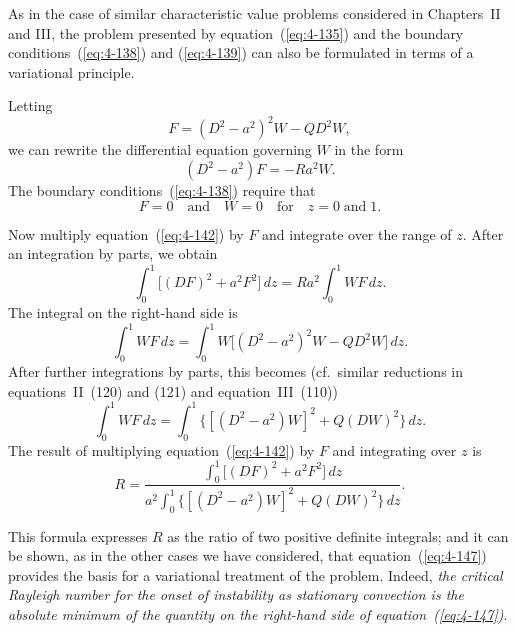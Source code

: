 As in the case of similar characteristic value problems considered in Chapters~II and III, the problem presented by equation~(\ref{eq:4-135}) and the boundary conditions~(\ref{eq:4-138}) and (\ref{eq:4-139}) can also be formulated in terms of a variational principle.

Letting
\begin{equation}
\label{eq:4-141}
F = (D^2-a^2)^2 W - QD^2 W,
\end{equation}
we can rewrite the differential equation governing $W$ in the form
\begin{equation}
\label{eq:4-142}
(D^2-a^2)F = -Ra^2 W.
\end{equation}
The boundary conditions~(\ref{eq:4-138}) require that
\begin{equation}
\label{eq:4-143}
F = 0 \quad\text{and}\quad W = 0 \quad \text{for}\quad z = 0\;\text{and}\;1.
\end{equation}

Now multiply equation~(\ref{eq:4-142}) by $F$ and integrate over the range of $z$. After an integration by parts, we obtain
\begin{equation}
\label{eq:4-144}
\int_0^1 \bigl[(DF)^2+a^2 F^2\bigr]\,dz = Ra^2\int_0^1 WF\,dz.
\end{equation}
The integral on the right-hand side is
\begin{equation}
\label{eq:4-145}
\int_0^1 WF\,dz = \int_0^1 W\bigl[(D^2-a^2)^2 W - QD^2 W\bigr]\,dz.
\end{equation}
After further integrations by parts, this becomes (cf.\ similar reductions in equations~II~(120) and (121) and equation~III~(110))
\begin{equation}
\label{eq:4-146}
\int_0^1 WF\,dz = \int_0^1\bigl\{[(D^2-a^2)W]^2+Q(DW)^2\bigr\}\,dz.
\end{equation}
The result of multiplying equation~(\ref{eq:4-142}) by $F$ and integrating over $z$ is
\begin{equation}
\label{eq:4-147}
R = \frac{\displaystyle\int_0^1 \bigl[(DF)^2+a^2 F^2\bigr]\,dz}{a^2\displaystyle\int_0^1\bigl\{[(D^2-a^2)W]^2+Q(DW)^2\bigr\}\,dz}.
\end{equation}

This formula expresses $R$ as the ratio of two positive definite integrals; and it can be shown, as in the other cases we have considered, that equation~(\ref{eq:4-147}) provides the basis for a variational treatment of the problem. Indeed, \emph{the critical Rayleigh number for the onset of instability as stationary convection is the absolute minimum of the quantity on the right-hand side of equation~(\ref{eq:4-147})}.

